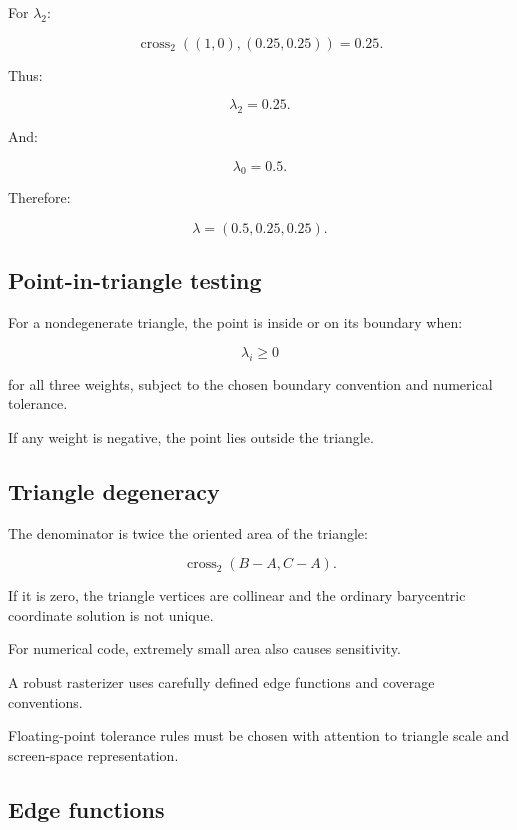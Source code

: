 For \(\lambda_2\):

\[
 \operatorname{cross}_2((1,0),(0.25,0.25))=0.25.
\]

Thus:

\[
 \lambda_2=0.25.
\]

And:

\[
 \lambda_0=0.5.
\]

Therefore:

\[
 \boxed{ \lambda=(0.5,0.25,0.25) }.
\]

\subsection{Point-in-triangle testing}\label{02-foundations-ii-ch034-point-in-triangle-testing}

\hypertarget{02-foundations-ii-ch034-point-in-triangle-testing}{}

For a nondegenerate triangle, the point is inside or on its boundary when:

\[
 \boxed{ \lambda_i\ge0 }
\]

for all three weights, subject to the chosen boundary convention and numerical tolerance.

If any weight is negative, the point lies outside the triangle.

\subsection{Triangle degeneracy}\label{02-foundations-ii-ch034-triangle-degeneracy}

\hypertarget{02-foundations-ii-ch034-triangle-degeneracy}{}

The denominator is twice the oriented area of the triangle:

\[
 \operatorname{cross}_2(B-A,C-A).
\]

If it is zero, the triangle vertices are collinear and the ordinary barycentric coordinate solution is not unique.

For numerical code, extremely small area also causes sensitivity.

A robust rasterizer uses carefully defined edge functions and coverage conventions.

Floating-point tolerance rules must be chosen with attention to triangle scale and screen-space representation.

\subsection{Edge functions}\label{02-foundations-ii-ch034-edge-functions}

